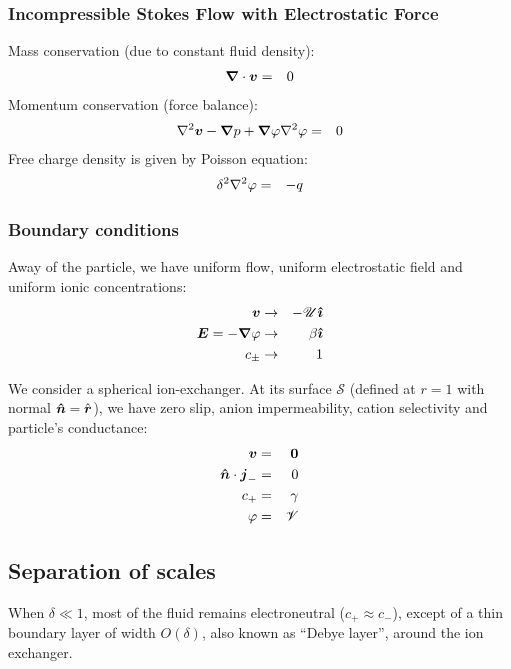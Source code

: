 \subsubsection{Incompressible Stokes Flow with Electrostatic Force}
Mass conservation (due to constant fluid density):
\begin{eqnarray}
\boldsymbol{\nabla} \cdot \boldsymbol{v} &=& 0
\end{eqnarray}
Momentum conservation (force balance):
\begin{eqnarray}
\nabla^2 \boldsymbol{v} - \boldsymbol{\nabla} p + \boldsymbol{\nabla} \varphi \nabla^2 \varphi &=& 0
\end{eqnarray}
Free charge density is given by Poisson equation:
\begin{eqnarray}
\delta^2 \nabla^2 \varphi &=& -q
\end{eqnarray}

\subsubsection{Boundary conditions}
Away of the particle, we have uniform flow, uniform electrostatic field
and uniform ionic concentrations:
\begin{eqnarray}
\boldsymbol{v} &\rightarrow& -\mathscr{U} \boldsymbol{\hat{\imath}} \\
\boldsymbol{E} = -\boldsymbol{\nabla} \varphi &\rightarrow& \beta\boldsymbol{\hat{\imath}} \\
c_\pm &\rightarrow& 1
\end{eqnarray}

We consider a spherical ion-exchanger. 
At its surface $\mathcal{S}$ (defined at $r=1$ with normal $\boldsymbol{\hat{n}} = \hat{\boldsymbol{r}}$), 
we have zero slip, anion impermeability, cation selectivity 
and particle's conductance:
\begin{eqnarray}
\boldsymbol{v} & = & \boldsymbol{0} \\
\boldsymbol{\hat{n}} \cdot \boldsymbol{j}_- & = & 0 \\
c_+ & = & \gamma \\
\varphi & = & \mathscr{V}
\end{eqnarray}

\subsection{Separation of scales}
When $\delta \ll 1$, 
most of the fluid remains electroneutral ($c_+ \approx c_-$), 
except of a thin boundary layer of width $O(\delta)$, 
also known as ``Debye layer'', around the ion exchanger. 

